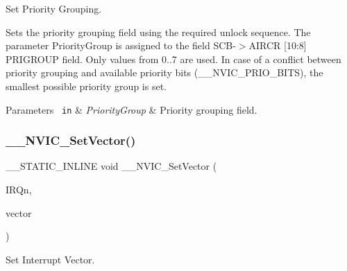 Set Priority Grouping. 

Sets the priority grouping field using the required unlock sequence. The parameter Priority\+Group is assigned to the field S\+C\+B-\/$>$A\+I\+R\+CR \mbox{[}10\+:8\mbox{]} P\+R\+I\+G\+R\+O\+UP field. Only values from 0..7 are used. In case of a conflict between priority grouping and available priority bits (\+\_\+\+\_\+\+N\+V\+I\+C\+\_\+\+P\+R\+I\+O\+\_\+\+B\+I\+TS), the smallest possible priority group is set. 
\begin{DoxyParams}[1]{Parameters}
\mbox{\texttt{ in}}  & {\em Priority\+Group} & Priority grouping field. \\
\hline
\end{DoxyParams}
\mbox{\label{group___c_m_s_i_s___core___n_v_i_c_functions_ga0df355460bc1783d58f9d72ee4884208}} 
\subsubsection{\texorpdfstring{\_\_NVIC\_SetVector()}{\_\_NVIC\_SetVector()}}
{\footnotesize\ttfamily \+\_\+\+\_\+\+S\+T\+A\+T\+I\+C\+\_\+\+I\+N\+L\+I\+NE void \+\_\+\+\_\+\+N\+V\+I\+C\+\_\+\+Set\+Vector (\begin{DoxyParamCaption}\item[{I\+R\+Qn\+\_\+\+Type}]{I\+R\+Qn,  }\item[{uint32\+\_\+t}]{vector }\end{DoxyParamCaption})}



Set Interrupt Vector. 

